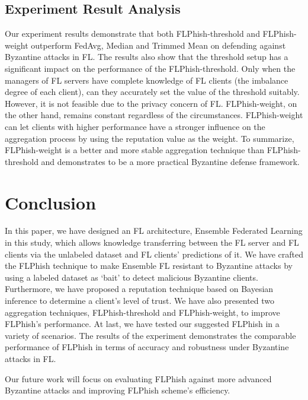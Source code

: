 \documentclass[journal]{IEEEtran}
\begin{document}
    \subsection{{Experiment Result Analysis}} Our experiment results demonstrate that both FLPhish-threshold and FLPhish-weight outperform FedAvg, Median \cite{ref_13_defense} and Trimmed Mean \cite{ref_13_defense} on defending against Byzantine attacks in FL. The results also show that the threshold setup has a significant impact on the performance of the FLPhish-threshold. Only when the managers of FL servers have complete knowledge of FL clients (the imbalance degree of each client), can they accurately set the value of the threshold suitably. However, it is not feasible due to the privacy concern of FL. FLPhish-weight, on the other hand, remains constant regardless of the circumstances. FLPhish-weight can let clients with higher performance have a stronger influence on the aggregation process by using the reputation value as the weight. To summarize, FLPhish-weight is a better and more stable aggregation technique than FLPhish-threshold and demonstrates to be a more practical Byzantine defense framework.






\section{Conclusion}

In this paper, we have designed an FL architecture, Ensemble Federated Learning in this study, which allows knowledge transferring between the FL server and FL clients via the unlabeled dataset and FL clients' predictions of it. We have crafted the FLPhish technique to make Ensemble FL resistant to Byzantine attacks by using a labeled dataset as `bait' to detect malicious Byzantine clients. Furthermore, we have proposed a reputation technique based on Bayesian inference to determine a client's level of trust. We have also presented two aggregation techniques, FLPhish-threshold and FLPhish-weight, to improve FLPhish's performance. At last, we have tested our suggested FLPhish in a variety of scenarios. The results of the experiment demonstrates the comparable performance of FLPhish in terms of accuracy and robustness under Byzantine attacks in FL. 
\par Our future work will focus on evaluating FLPhish against more advanced Byzantine attacks and improving FLPhish scheme's efficiency.









\end{document}
